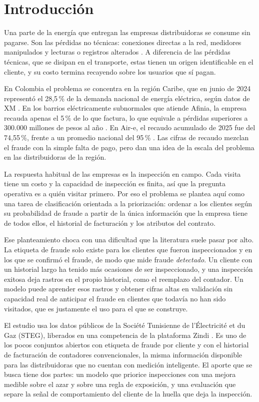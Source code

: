 \section{Introducción}\label{sec:introduccion}

Una parte de la energía que entregan las empresas distribuidoras se consume sin pagarse.
Son las pérdidas no técnicas: conexiones directas a la red, medidores manipulados y lecturas
o registros alterados \parencite{glauner2017}. A diferencia de las pérdidas técnicas, que se
disipan en el transporte, estas tienen un origen identificable en el cliente, y su costo
termina recayendo sobre los usuarios que sí pagan.

En Colombia el problema se concentra en la región Caribe, que en junio de 2024 representó
el 28,5\,\% de la demanda nacional de energía eléctrica, según datos de XM
\parencite{elheraldo2024}. En los barrios eléctricamente subnormales que atiende Afinia, la
empresa recauda apenas el 5\,\% de lo que factura, lo que equivale a pérdidas superiores a
300.000 millones de pesos al año \parencite{portafolio2025}. En Air-e, el recaudo acumulado
de 2025 fue del 74,55\,\%, frente a un promedio nacional del 95\,\% \parencite{elheraldo2025}.
Las cifras de recaudo mezclan el fraude con la simple falta de pago, pero dan una idea de la
escala del problema en las distribuidoras de la región.

La respuesta habitual de las empresas es la inspección en campo. Cada visita tiene un costo
y la capacidad de inspección es finita, así que la pregunta operativa es a quién visitar
primero. Por eso el problema se plantea aquí como una tarea de
clasificación orientada a la priorización: ordenar a los clientes según su probabilidad de
fraude a partir de la única información que la empresa tiene de todos ellos, el historial
de facturación y los atributos del contrato.

Ese planteamiento choca con una dificultad que la literatura suele pasar por alto. La
etiqueta de fraude solo existe para los clientes que fueron inspeccionados y en los que se
confirmó el fraude, de modo que mide fraude \emph{detectado}. Un cliente con un historial
largo ha tenido más ocasiones de ser inspeccionado, y una inspección exitosa deja rastros en
el propio historial, como el reemplazo del contador. Un modelo puede aprender esos rastros y
obtener cifras altas en validación sin capacidad real de anticipar el fraude en clientes que
todavía no han sido visitados, que es justamente el uso para el que se construye.

El estudio usa los datos públicos de la Société Tunisienne de l'Électricité et du Gaz
(STEG), liberados en una competencia de la plataforma Zindi \parencite{zindi2019}. Es uno de
los pocos conjuntos abiertos con etiqueta de fraude por cliente y con el historial de
facturación de contadores convencionales, la misma información disponible para las
distribuidoras que no cuentan con medición inteligente. El aporte que se busca tiene dos
partes: un modelo que priorice inspecciones con una mejora medible sobre el azar y sobre una
regla de exposición, y una evaluación que separe la señal de comportamiento del cliente de
la huella que deja la inspección.

